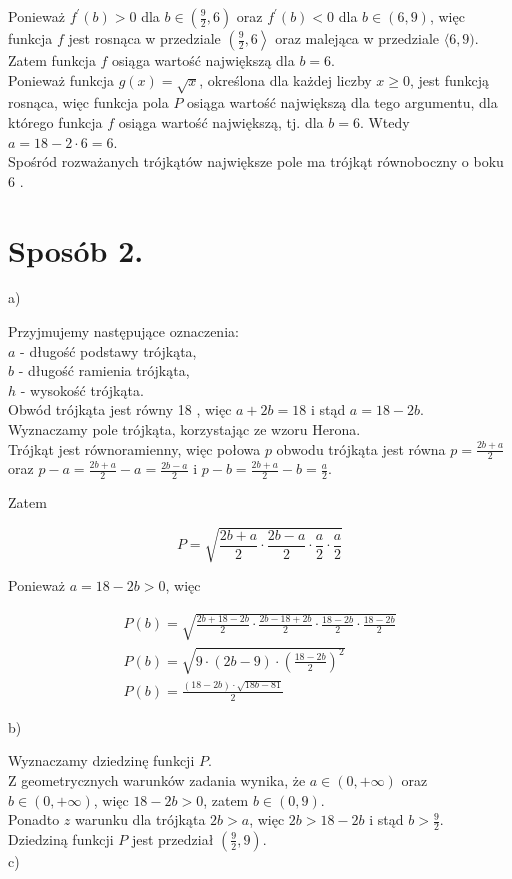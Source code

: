 \documentclass[10pt]{article}
\begin{document}
Ponieważ $f^{\prime}(b)>0$ dla $b \in\left(\frac{9}{2}, 6\right)$ oraz $f^{\prime}(b)<0$ dla $b \in(6,9)$, więc funkcja $f$ jest rosnąca w przedziale $\left(\frac{9}{2}, 6\right\rangle$ oraz malejąca w przedziale $\langle 6,9)$. Zatem funkcja $f$ osiąga wartość największą dla $b=6$.\\
Ponieważ funkcja $g(x)=\sqrt{x}$, określona dla każdej liczby $x \geq 0$, jest funkcją rosnąca, więc funkcja pola $P$ osiąga wartość największą dla tego argumentu, dla którego funkcja $f$ osiąga wartość największą, tj. dla $b=6$. Wtedy $a=18-2 \cdot 6=6$.\\
Spośród rozważanych trójkątów największe pole ma trójkąt równoboczny o boku 6 .

\section*{Sposób 2.}
a)

Przyjmujemy następujące oznaczenia:\\
$a$ - długość podstawy trójkąta,\\
$b$ - długość ramienia trójkąta,\\
$h$ - wysokość trójkąta.\\
Obwód trójkąta jest równy 18 , więc $a+2 b=18$ i stąd $a=18-2 b$.\\
Wyznaczamy pole trójkąta, korzystając ze wzoru Herona.\\
Trójkąt jest równoramienny, więc połowa $p$ obwodu trójkąta jest równa $p=\frac{2 b+a}{2}$ oraz $p-a=\frac{2 b+a}{2}-a=\frac{2 b-a}{2}$ i $p-b=\frac{2 b+a}{2}-b=\frac{a}{2}$.

Zatem

$$
P=\sqrt{\frac{2 b+a}{2} \cdot \frac{2 b-a}{2} \cdot \frac{a}{2} \cdot \frac{a}{2}}
$$

Ponieważ $a=18-2 b>0$, więc

$$
\begin{gathered}
P(b)=\sqrt{\frac{2 b+18-2 b}{2} \cdot \frac{2 b-18+2 b}{2} \cdot \frac{18-2 b}{2} \cdot \frac{18-2 b}{2}} \\
P(b)=\sqrt{9 \cdot(2 b-9) \cdot\left(\frac{18-2 b}{2}\right)^{2}} \\
P(b)=\frac{(18-2 b) \cdot \sqrt{18 b-81}}{2}
\end{gathered}
$$

b)

Wyznaczamy dziedzinę funkcji $P$.\\
Z geometrycznych warunków zadania wynika, że $a \in(0,+\infty)$ oraz $b \in(0,+\infty)$, więc $18-2 b>0$, zatem $b \in(0,9)$.\\
Ponadto $z$ warunku dla trójkąta $2 b>a$, więc $2 b>18-2 b$ i stąd $b>\frac{9}{2}$.\\
Dziedziną funkcji $P$ jest przedział $\left(\frac{9}{2}, 9\right)$.\\
c)
\end{document}
